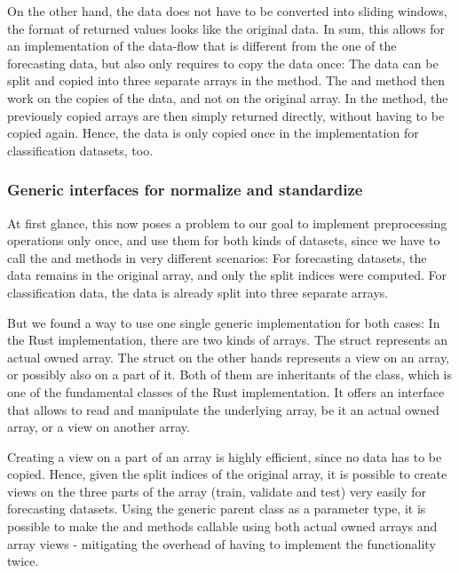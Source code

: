 \documentclass[review]{AIM_report}
\begin{document}
On the other hand, the data does not have to be converted into sliding windows, the format of returned values looks like the original data. In sum, this allows for an implementation of the data-flow that is different from the one of the forecasting data, but also only requires to copy the data once: The data can be split and copied into three separate arrays in the \splitShort method. The \normalize and \standardize method then work on the copies of the data, and not on the original array. In the \collect method, the previously copied arrays are then simply returned directly, without having to be copied again. Hence, the data is only copied once in the implementation for classification datasets, too.

\subsubsection{Generic interfaces for normalize and standardize}

At first glance, this now poses a problem to our goal to implement preprocessing operations only once, and use them for both kinds of datasets, since we have to call the \normalize and \standardize methods in very different scenarios: For forecasting datasets, the data remains in the original array, and only the split indices were computed. For classification data, the data is already split into three separate arrays.

But we found a way to use one single generic implementation for both cases: In the Rust \numpy implementation, there are two kinds of arrays. The struct \arrayrust represents an actual owned array. The struct \arrayview on the other hands represents a view on an array, or possibly also on a part of it. Both of them are inheritants of the \arraybase class, which is one of the fundamental classes of the Rust \numpy implementation. It offers an interface that allows to read and manipulate the underlying array, be it an actual owned array, or a view on another array.

Creating a view on a part of an array is highly efficient, since no data has to be copied. Hence, given the split indices of the original array, it is possible to create views on the three parts of the array (train, validate and test) very easily for forecasting datasets. Using the generic parent class \arraybase as a parameter type, it is possible to make the \normalize and \standardize methods callable using both actual owned arrays and array views - mitigating the overhead of having to implement the functionality twice.
\end{document}
